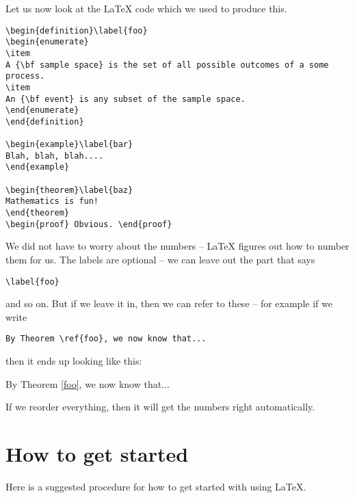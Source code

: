 \documentclass[12pt, leqno]{article}
\newenvironment{proof}{\noindent {\bf Proof:}}{$\Box$ \vspace{2 ex}}
\newtheorem{theorem}[proposition]{Theorem}
\newtheorem{example}[proposition]{Example}
\newtheorem{definition}[proposition]{Definition}
\begin{document}
Let us now look at the LaTeX code which we used to produce this.

\begin{verbatim}
\begin{definition}\label{foo}
\begin{enumerate}
\item
A {\bf sample space} is the set of all possible outcomes of a some process.
\item
An {\bf event} is any subset of the sample space.
\end{enumerate}
\end{definition}

\begin{example}\label{bar}
Blah, blah, blah....
\end{example}

\begin{theorem}\label{baz}
Mathematics is fun!
\end{theorem}
\begin{proof} Obvious. \end{proof}
\end{verbatim}
We did not have to worry about the numbers -- LaTeX figures out how to number them for us. The labels are optional -- we can 
leave out the part that says \begin{verbatim}\label{foo}\end{verbatim} and so on. But if we leave it in, then we can refer to these --
for example if we write

\begin{verbatim}
By Theorem \ref{foo}, we now know that...
\end{verbatim}

then it ends up looking like this:

\medskip

By Theorem \ref{foo}, we now know that...

\medskip
If we reorder everything, then it will get the numbers right automatically.

\section{How to get started}
Here is a suggested procedure for how to get started with using LaTeX.
\end{document}
